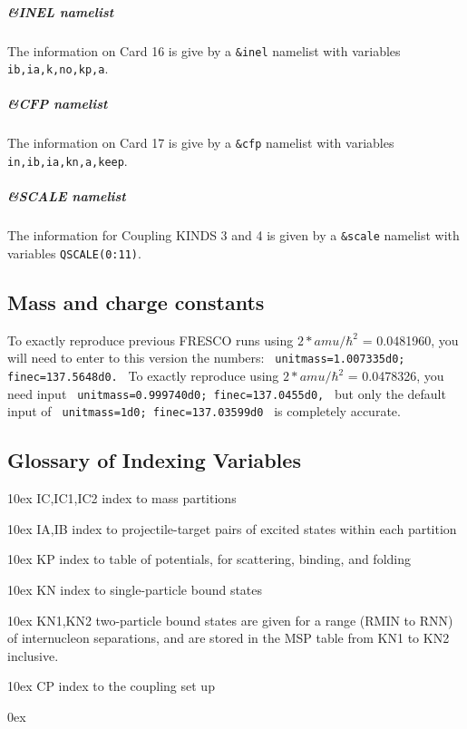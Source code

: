 \documentclass[11pt]{article}
\begin{document}
\subparagraph*{\&INEL namelist}

The information on Card 16 is give by a {\tt \&inel} namelist with variables
{\tt  ib,ia,k,no,kp,a}.


\subparagraph*{\&CFP namelist}

The information on Card 17 is give by a {\tt \&cfp} namelist with variables
{\tt in,ib,ia,kn,a,keep}.

\subparagraph*{\&SCALE namelist}

The information for Coupling KINDS 3 and 4  is given by a {\tt \&scale} namelist with
variables {\tt QSCALE(0:11)}.

\bigskip
\subsection*{Mass and charge constants}
To exactly reproduce previous FRESCO runs using $2*amu/\hbar^2$ = 0.0481960,
you will need to enter to this version the numbers:
{\tt
        unitmass=1.007335d0; finec=137.5648d0.
}
To exactly reproduce using $2*amu/\hbar^2$ = 0.0478326, you need input
{\tt
        unitmass=0.999740d0; finec=137.0455d0,
}
but only the default input of
{\tt
        unitmass=1d0; finec=137.03599d0
}
is completely accurate.


\bigskip
\subsection*{Glossary of Indexing Variables}
%

\hangindent 10ex
IC,IC1,IC2    index to mass partitions

\hangindent 10ex
IA,IB         index to projectile-target pairs of excited states
              within each partition

\hangindent 10ex
KP            index to table of potentials, for scattering, binding,
              and folding

\hangindent 10ex
KN            index to single-particle bound states

\hangindent 10ex
KN1,KN2       two-particle bound states are given for a range (RMIN to
              RNN) of internucleon separations, and are stored in the
              MSP table from KN1 to KN2 inclusive.

\hangindent 10ex
CP            index to the coupling set up

\hangindent 0ex
\end{document}
